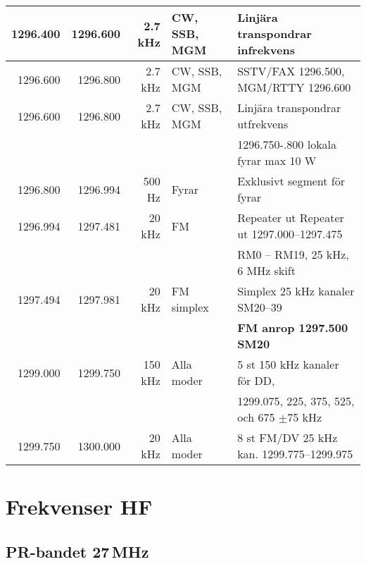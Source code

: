 \begin{tabular}{rrrll}
	         1296.400         & 1296.600      & 2.7 kHz     & CW, SSB, MGM    & Linjära transpondrar infrekvens                              \\ \hline
	         1296.600         & 1296.800      & 2.7 kHz     & CW, SSB, MGM    & SSTV/FAX 1296.500, MGM/RTTY 1296.600                         \\ \hline
	         1296.600         & 1296.800      & 2.7 kHz     & CW, SSB, MGM    & Linjära transpondrar utfrekvens                              \\
                                  &               &             &                 & 1296.750-.800 lokala fyrar max 10 W                          \\ \hline
	         1296.800         & 1296.994      & 500 Hz      & Fyrar           & Exklusivt segment för fyrar                                  \\ \hline
	         1296.994         & 1297.481      & 20 kHz      & FM              & Repeater ut Repeater ut 1297.000--1297.475                   \\
                                  &               &             &                 & RM0 – RM19, 25 kHz, 6 MHz skift                              \\ \hline
	         1297.494         & 1297.981      & 20 kHz      & FM simplex      & Simplex 25 kHz kanaler SM20--39                              \\
                                  &               &             &                 & \textbf{FM anrop 1297.500 SM20}                              \\ \hline
	         1299.000         & 1299.750      & 150 kHz     & Alla moder      & 5 st 150 kHz kanaler för DD,                                 \\
                                  &               &             &                 & 1299.075, 225, 375, 525, och 675 $\pm$75 kHz                 \\ \hline
	         1299.750         & 1300.000      & 20 kHz      & Alla moder      & 8 st FM/DV 25 kHz kan. 1299.775--1299.975
\end{tabular}
\normalsize
\clearpage

\section{Frekvenser HF}

\subsection{PR-bandet 27\,MHz}

